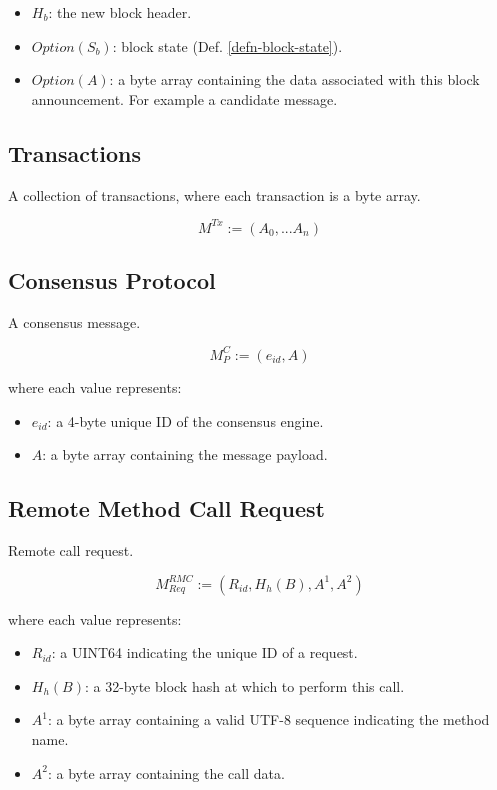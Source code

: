 \documentclass{book}
\begin{document}
\begin{itemize}
    \item $H_b$: the new block header.
    \item $Option(S_b)$: block state (Def. \ref{defn-block-state}).
    \item $Option(A)$: a byte array containing the data associated with this
    block announcement. For example a candidate message.
\end{itemize}

\subsection{Transactions}

A collection of transactions, where each transaction is a byte array.

\[
    M^{Tx} := (A_0, ... A_n)
\]

\subsection{Consensus Protocol}\label{sect-consensus-protocol}

A consensus message.

\[
    M^C_P := (e_{id}, A)
\]

where each value represents:

\begin{itemize}
    \item $e_{id}$: a 4-byte unique ID of the consensus engine.
    \item $A$: a byte array containing the message payload.
\end{itemize}

\subsection{Remote Method Call Request}

Remote call request.

\[
    M^{RMC}_{Req} := (R_{id}, H_h(B), A^1, A^2)
\]

where each value represents:

\begin{itemize}
    \item $R_{id}$: a UINT64 indicating the unique ID of a request.
    \item $H_h(B)$: a 32-byte block hash at which to perform this call.
    \item $A^1$: a byte array containing a valid UTF-8 sequence indicating the
    method name.
    \item $A^2$: a byte array containing the call data.
\end{itemize}
\end{document}
